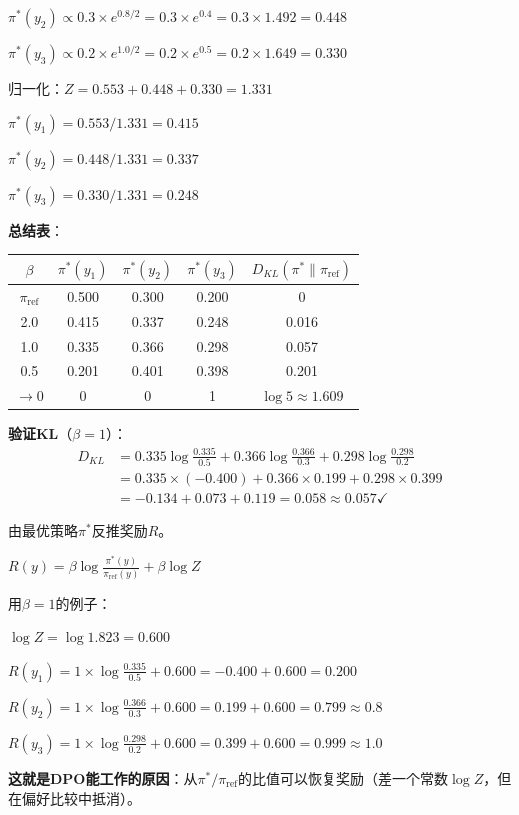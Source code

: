 \documentclass[11pt,a4paper]{article}
\theoremstyle{definition}
\begin{document}
\begin{calculation}[RLHF的详细数值例子]
$\pi^*(y_2) \propto 0.3 \times e^{0.8/2} = 0.3 \times e^{0.4} = 0.3 \times 1.492 = 0.448$

$\pi^*(y_3) \propto 0.2 \times e^{1.0/2} = 0.2 \times e^{0.5} = 0.2 \times 1.649 = 0.330$

归一化：$Z = 0.553 + 0.448 + 0.330 = 1.331$

$\pi^*(y_1) = 0.553/1.331 = 0.415$

$\pi^*(y_2) = 0.448/1.331 = 0.337$

$\pi^*(y_3) = 0.330/1.331 = 0.248$

\textbf{总结表}：
\begin{center}
\begin{tabular}{c|ccc|c}
\toprule
$\beta$ & $\pi^*(y_1)$ & $\pi^*(y_2)$ & $\pi^*(y_3)$ & $D_{KL}(\pi^* \| \pi_{\text{ref}})$ \\
\midrule
$\pi_{\text{ref}}$ & 0.500 & 0.300 & 0.200 & 0 \\
2.0 & 0.415 & 0.337 & 0.248 & 0.016 \\
1.0 & 0.335 & 0.366 & 0.298 & 0.057 \\
0.5 & 0.201 & 0.401 & 0.398 & 0.201 \\
$\to 0$ & 0 & 0 & 1 & $\log 5 \approx 1.609$ \\
\bottomrule
\end{tabular}
\end{center}

\textbf{验证KL}（$\beta = 1$）：
\begin{align*}
D_{KL} &= 0.335 \log \frac{0.335}{0.5} + 0.366 \log \frac{0.366}{0.3} + 0.298 \log \frac{0.298}{0.2} \\
&= 0.335 \times (-0.400) + 0.366 \times 0.199 + 0.298 \times 0.399 \\
&= -0.134 + 0.073 + 0.119 = 0.058 \approx 0.057 \checkmark
\end{align*}
\end{calculation}

\begin{calculation}[手算：隐式奖励的反推]
由最优策略$\pi^*$反推奖励$R$。

$R(y) = \beta \log \frac{\pi^*(y)}{\pi_{\text{ref}}(y)} + \beta \log Z$

用$\beta = 1$的例子：

$\log Z = \log 1.823 = 0.600$

$R(y_1) = 1 \times \log \frac{0.335}{0.5} + 0.600 = -0.400 + 0.600 = 0.200$ \checkmark

$R(y_2) = 1 \times \log \frac{0.366}{0.3} + 0.600 = 0.199 + 0.600 = 0.799 \approx 0.8$ \checkmark

$R(y_3) = 1 \times \log \frac{0.298}{0.2} + 0.600 = 0.399 + 0.600 = 0.999 \approx 1.0$ \checkmark

\textbf{这就是DPO能工作的原因}：从$\pi^*/\pi_{\text{ref}}$的比值可以恢复奖励（差一个常数$\log Z$，但在偏好比较中抵消）。
\end{calculation}
\end{document}
